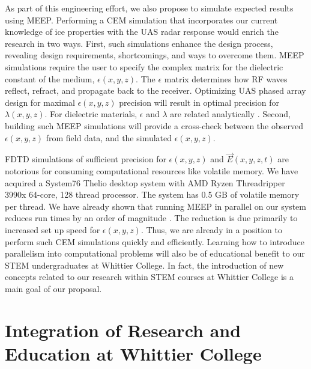 \documentclass[../../main.tex]{subfiles}
\begin{document}
As part of this engineering effort, we also propose to simulate expected results using MEEP.  Performing a CEM simulation that incorporates our current knowledge of ice properties with the UAS radar response would enrich the research in two ways.  First, such simulations enhance the design process, revealing design requirements, shortcomings, and ways to overcome them.  MEEP simulations require the user to specify the complex matrix for the dielectric constant of the medium, $\epsilon(x,y,z)$.  The $\epsilon$ matrix  determines how RF waves reflect, refract, and propagate back to the receiver.  Optimizing UAS phased array design for maximal $\epsilon(x,y,z)$ precision will result in optimal precision for $\lambda(x,y,z)$.  For dielectric materials, $\epsilon$ and $\lambda$ are related analytically \cite{10.3189/2015jog14j214}.  Second, building such MEEP simulations will provide a cross-check between the observed $\epsilon(x,y,z)$ from field data, and the simulated $\epsilon(x,y,z)$. \\ \vspace{2.5mm}

FDTD simulations of sufficient precision for $\epsilon(x,y,z)$ and $\vec{E}(x,y,z,t)$ are notorious for consuming computational resources like volatile memory.  We have acquired a System76 Thelio desktop system with AMD Ryzen Threadripper 3990x 64-core, 128 thread processor.  The system has 0.5 GB of volatile memory per thread.  We have already shown that running MEEP in parallel on our system reduces run times by an order of magnitude \cite{meepcon2022}.  The reduction is due primarily to increased set up speed for $\epsilon(x,y,z)$.  Thus, we are already in a position to perform such CEM simulations quickly and efficiently.  Learning how to introduce parallelism into computational problems will also be of educational benefit to our STEM undergraduates at Whittier College.  In fact, the introduction of new concepts related to our research within STEM courses at Whittier College is a main goal of our proposal.

\section{Integration of Research and Education at Whittier College}
\label{sec:int}
\end{document}
